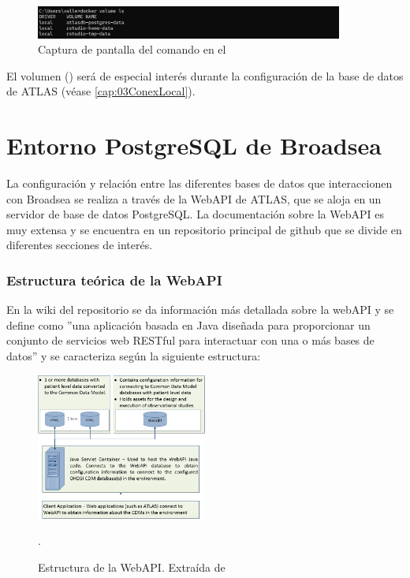 \begin{figure}[H]
    \centering
    \includegraphics[width=0.90\textwidth]{figures/dockerVolumesCDM.png}
     \caption{Captura de pantalla del comando  en el }
    \label{fig:dockerVolumesCDM}
\end{figure}

El volumen  () será de especial interés durante la configuración de la base de datos de ATLAS (véase \ref{cap:03ConexLocal}).

\section{Entorno PostgreSQL de Broadsea}

La configuración y relación entre las diferentes bases de datos que interaccionen con Broadsea se realiza a través de la WebAPI de ATLAS, que se aloja en un servidor de base de datos PostgreSQL. La documentación sobre la WebAPI es muy extensa y se encuentra en un repositorio principal de github \cite{githubWebAPI} que se divide en diferentes secciones de interés.

\subsubsection{Estructura teórica de la WebAPI}

En la wiki del repositorio \cite{githubWebAPIwiki} se da información más detallada sobre la webAPI y se define como ''una aplicación basada en Java diseñada para proporcionar un conjunto de servicios web RESTful para interactuar con una o más bases de datos'' y se caracteriza según la siguiente estructura:

\begin{figure}[H]
    \centering
    \includegraphics[width=0.50\textwidth]{figures/webAPIwiki.png}
     \caption{Estructura de la WebAPI. Extraída de \cite{githubWebAPIwiki}}.
    \label{fig:webAPIwiki}
\end{figure}

